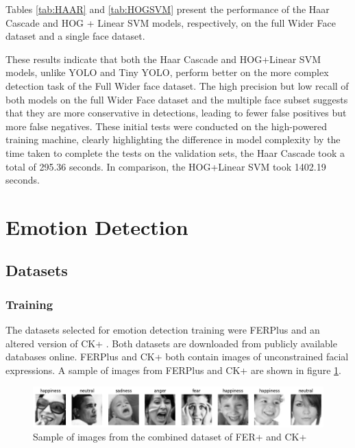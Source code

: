 Tables \ref{tab:HAAR} and \ref{tab:HOGSVM} present the performance of the Haar Cascade and HOG + Linear SVM models, respectively, on the full Wider Face dataset and a single face dataset.

These results indicate that both the Haar Cascade and HOG+Linear SVM models, unlike YOLO and Tiny YOLO, perform better on the more complex detection task of the Full Wider face dataset. The high precision but low recall of both models on the full Wider Face dataset and the multiple face subset suggests that they are more conservative in detections, leading to fewer false positives but more false negatives. These initial tests were conducted on the high-powered training machine, clearly highlighting the difference in model complexity by the time taken to complete the tests on the validation sets, the Haar Cascade took a total of 295.36 seconds. In comparison, the HOG+Linear SVM took 1402.19 seconds.

\section{Emotion Detection}
\subsection{Datasets}
\subsubsection{Training}

The datasets selected for emotion detection training were FERPlus \cite{BarsoumICMI2016} and an altered version of CK+ \cite{5543262}. Both datasets are downloaded from publicly available databases online. FERPlus and CK+ both contain images of unconstrained facial expressions. A sample of images from FERPlus and CK+ are shown in figure \ref{figure:sample_imgs}.

\begin{figure}[!htb]
    \centering{}
    \includegraphics[scale=0.5]{fed_images/random_imgs.png}
    \caption{Sample of images from the combined dataset of FER+ and CK+}
    \label{figure:sample_imgs}
\end{figure}

